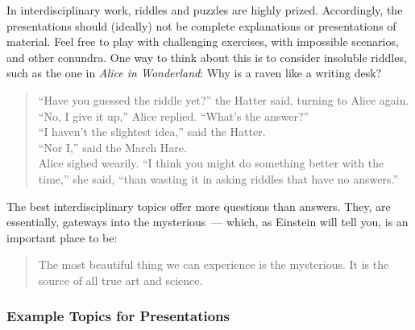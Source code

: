 \documentclass[letterpaper,10pt,headsepline]{scrreprt}
\begin{document}
In interdisciplinary work, riddles and puzzles are highly prized. Accordingly, the presentations should (ideally) not be complete
explanations or presentations of material. Feel free to play with challenging exercises, with impossible scenarios, and other conundra.
One way to think about this is to consider insoluble riddles, such as the one in \textit{Alice in Wonderland}: Why is a raven like a
writing desk?

\begin{quote}
  ``Have you guessed the riddle yet?'' the Hatter said, turning to Alice again.\\
``No, I give it up,'' Alice replied. ``What's the answer?''\\
``I haven't the slightest idea,'' said the Hatter.\\
``Nor I,'' said the March Hare.\\
Alice sighed wearily. ``I think you might do something better with the time,'' she said, ``than wasting it in asking riddles that have no answers.''
\end{quote}

The best interdisciplinary topics offer more questions than answers. They, are essentially, gateways into the mysterious~--- which, as
Einstein will tell you, is an important place to be:

\begin{quote}
  The most beautiful thing we can experience is the mysterious. It is
  the source of all true art and science.
\end{quote}

\subsubsection{Example Topics for Presentations}
\end{document}
